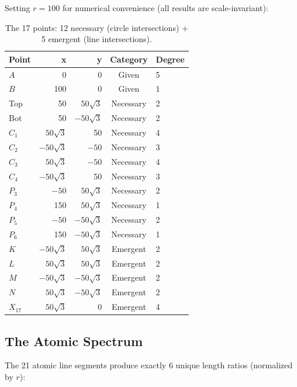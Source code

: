 \documentclass[12pt, a4paper]{article}
\begin{document}
Setting $r = 100$ for numerical convenience (all results are scale-invariant):

\begin{table}[h]
\centering
\small
\begin{tabular}{@{}lrrcl@{}}
\toprule
\textbf{Point} & \textbf{x} & \textbf{y} & \textbf{Category} & \textbf{Degree} \\
\midrule
$A$ & 0 & 0 & Given & 5 \\
$B$ & 100 & 0 & Given & 1 \\
Top & 50 & $50\sqrt{3}$ & Necessary & 2 \\
Bot & 50 & $-50\sqrt{3}$ & Necessary & 2 \\
$C_1$ & $50\sqrt{3}$ & 50 & Necessary & 4 \\
$C_2$ & $-50\sqrt{3}$ & $-50$ & Necessary & 3 \\
$C_3$ & $50\sqrt{3}$ & $-50$ & Necessary & 4 \\
$C_4$ & $-50\sqrt{3}$ & 50 & Necessary & 3 \\
$P_3$ & $-50$ & $50\sqrt{3}$ & Necessary & 2 \\
$P_4$ & 150 & $50\sqrt{3}$ & Necessary & 1 \\
$P_5$ & $-50$ & $-50\sqrt{3}$ & Necessary & 2 \\
$P_6$ & 150 & $-50\sqrt{3}$ & Necessary & 1 \\
$K$ & $-50\sqrt{3}$ & $50\sqrt{3}$ & Emergent & 2 \\
$L$ & $50\sqrt{3}$ & $50\sqrt{3}$ & Emergent & 2 \\
$M$ & $-50\sqrt{3}$ & $-50\sqrt{3}$ & Emergent & 2 \\
$N$ & $50\sqrt{3}$ & $-50\sqrt{3}$ & Emergent & 2 \\
$X_{17}$ & $50\sqrt{3}$ & 0 & Emergent & 4 \\
\bottomrule
\end{tabular}
\caption{The 17 points: 12 necessary (circle intersections) + 5 emergent (line intersections).}\label{tab:points}
\end{table}

\subsection{The Atomic Spectrum}\label{sec:spectrum}

The 21 atomic line segments produce exactly 6 unique length ratios (normalized by $r$):
\end{document}
